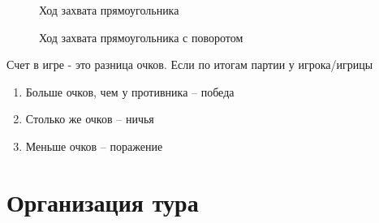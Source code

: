\documentclass[11pt]{article} %
\begin{document}
\begin{figure}[h!]
\begin{minipage}{0.5\textwidth}
    \caption{Ход захвата прямоугольника}
\end{minipage}
\begin{minipage}{0.5\textwidth}
    \caption{Ход захвата прямоугольника с поворотом}
\end{minipage}
\end{figure}

Счет в игре - это разница очков. Если по итогам партии у игрока/игрицы
\begin{enumerate}
    \item Больше очков, чем у противника  -- победа
    \item Столько же очков -- ничья
    \item Меньше очков -- поражение
\end{enumerate}

\newpage
\section*{Организация тура}
\end{document}
